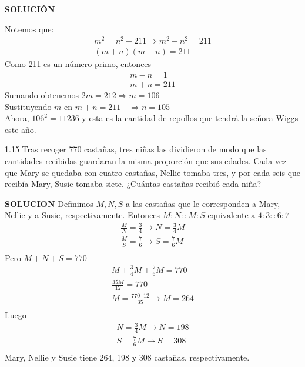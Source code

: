 \textbf{SOLUCIÓN}
\begin{center}
    
\end{center}
Notemos que:
\begin{gather*}
    m^{2} = n^{2} + 211 \Rightarrow m^{2} - n^{2} = 211
    \\ (m+n)(m-n) = 211
\end{gather*}
Como 211 es un número primo, entonces
\begin{equation*}
    \begin{aligned}
        m-n = 1\\
        m+n = 211
    \end{aligned}
\end{equation*}
Sumando obtenemos $2m = 212 \Rightarrow m = 106$\\
Sustituyendo $m$ en $m+n = 211 \quad \Rightarrow n =105$ \\

Ahora, $106^{2} = 11236$ y esta es la cantidad de repollos que tendrá la señora Wiggs este año.

\begin{excercise}
    1.15 Tras recoger 770 castañas, tres niñas las dividieron de modo que las cantidades recibidas guardaran la misma proporción que sus edades. Cada vez que Mary se quedaba con cuatro castañas, Nellie tomaba tres, y por cada seis que recibía Mary, Susie tomaba siete. ¿Cuántas castañas recibió cada niña?
\end{excercise}

\textbf{SOLUCION}
Definimos $M,N,S$ a las castañas que le corresponden a Mary, Nellie y a Susie, respectivamente. Entonces $M:N :: M:S\text{ equivalente a } 4:3 :: 6:7$
\begin{gather*}
    \frac{M}{N} = \frac{3}{4} \rightarrow N = \frac{3}{4}M \\
    \frac{M}{S} = \frac{7}{6} \rightarrow S = \frac{7}{6}M \\
\end{gather*}
Pero $M+N+S = 770$
\begin{gather*}
    M + \frac{3}{4}M + \frac{7}{6}M = 770 \\
    \frac{35M}{12} = 770 \\
    M = \frac{770 \cdot 12}{35} \rightarrow M = 264\\
\end{gather*}
Luego
\begin{gather*}
    N = \frac{3}{4}M \rightarrow N = 198\\
    S = \frac{7}{6}M \rightarrow S = 308\\
\end{gather*}
Mary, Nellie y Susie tiene 264, 198 y 308 castañas, respectivamente.